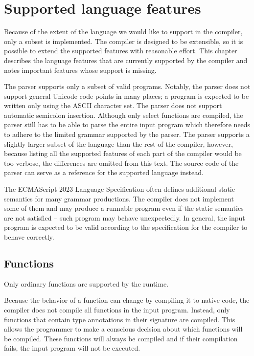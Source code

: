 \chapter{Supported language features}\label{supported_lang}

Because of the extent of the language we would like to support in the compiler, only a subset is implemented. The compiler is designed to be extensible, so it is possible to extend the supported features with reasonable effort. This chapter describes the language features that are currently supported by the compiler and notes important features whose support is missing.

The parser supports only a subset of valid programs. Notably, the parser does not support general Unicode code points in many places; a program is expected to be written only using the ASCII character set. The parser does not support automatic semicolon insertion. Although only select functions are compiled, the parser still has to be able to parse the entire input program which therefore needs to adhere to the limited grammar supported by the parser. The parser supports a slightly larger subset of the language than the rest of the compiler, however, because listing all the supported features of each part of the compiler would be too verbose, the differences are omitted from this text. The source code of the parser can serve as a reference for the supported language instead.

The ECMAScript 2023 Language Specification\cite{ecma262} often defines additional static semantics for many grammar productions. The compiler does not implement some of them and may produce a runnable program even if the static semantics are not satisfied -- such program may behave unexpectedly. In general, the input program is expected to be valid according to the specification for the compiler to behave correctly.


\section{Functions}

Only ordinary functions are supported by the runtime.

Because the behavior of a function can change by compiling it to native code, the compiler does not compile all functions in the input program. Instead, only functions that contain type annotations in their signature are compiled. This allows the programmer to make a conscious decision about which functions will be compiled. These functions will always be compiled and if their compilation fails, the input program will not be executed.

